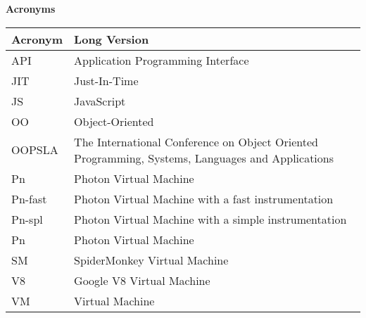 \begin{center}
\textbf{\large Acronyms}
\end{center}


\vspace{1cm}

\begin{center}
\begin{tabular}{|p{}|p{}|}
  \hline
  Acronym & Long Version\\
  \hline \hline
  API & Application Programming Interface\\
  \hline
  JIT & Just-In-Time\\
  \hline
  JS & JavaScript\\
  \hline
  OO & Object-Oriented\\
  \hline
  OOPSLA & The International Conference on Object Oriented Programming, Systems, Languages and Applications \\
  \hline
  Pn & Photon Virtual Machine\\
  \hline
  Pn-fast & Photon Virtual Machine with a fast instrumentation\\
  \hline
  Pn-spl & Photon Virtual Machine with a simple instrumentation\\
  \hline
  Pn & Photon Virtual Machine\\
  \hline
  SM & SpiderMonkey Virtual Machine\\
  \hline
  V8 & Google V8 Virtual Machine\\
  \hline
  VM & Virtual Machine\\
  \hline
\end{tabular}
\end{center}

